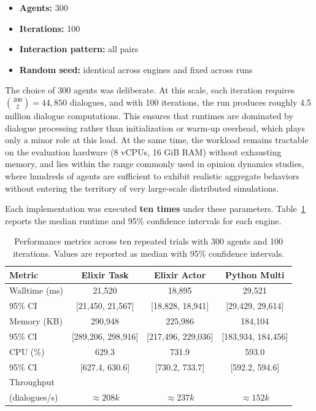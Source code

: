 \documentclass[
]{ceurart}
\begin{document}
\begin{itemize}
	\item \textbf{Agents:} 300
	\item \textbf{Iterations:} 100
	\item \textbf{Interaction pattern:} all pairs
\item \textbf{Random seed:} identical across engines and fixed across runs
\end{itemize}

The choice of 300 agents was deliberate. At this scale, each iteration requires $\binom{300}{2} = 44{,}850$ dialogues, and with 100 iterations, the run produces roughly 4.5 million dialogue computations. This ensures that runtimes are dominated by dialogue processing rather than initialization or warm-up overhead, which plays only a minor role at this load. At the same time, the workload remains tractable on the evaluation hardware (8 vCPUs, 16 GiB RAM) without exhausting memory, and lies within the range commonly used in opinion dynamics studies, where hundreds of agents are sufficient to exhibit realistic aggregate behaviors without entering the territory of very large-scale distributed simulations.


Each implementation was executed \textbf{ten times} under these parameters. Table~\ref{tab:runtime_trials} reports the median runtime and 95\% confidence intervals for each engine.

\begin{table}[ht]
\centering
\caption{Performance metrics across ten repeated trials with 300 agents and 100 iterations.
Values are reported as median with 95\% confidence intervals.}\label{tab:runtime_trials}
\begin{tabular}{lccc}
\toprule
Metric & Elixir Task & Elixir Actor & Python Multi \\
\midrule
Walltime (ms) & 21,520 & 18,895 & 29,521 \\
95\% CI & [21,450, 21,567] & [18,828, 18,941] & [29,429, 29,614] \\
Memory (KB) & 290,948 & 225,986 & 184,104 \\
95\% CI & [289,206, 298,916] & [217,496, 229,036] & [183,934, 184,456] \\
CPU (\%) & 629.3 & 731.9 & 593.0 \\
95\% CI & [627.4, 630.6] & [730.2, 733.7] & [592.2, 594.6] \\
Throughput\\ 
(dialogues/s) & $\approx 208k$ & $\approx 237k$ & $\approx 152k$  \\
\bottomrule
\end{tabular}
\end{table}
\end{document}

